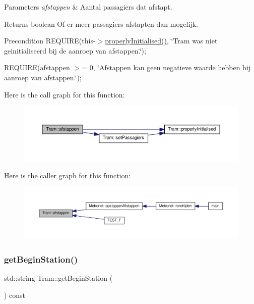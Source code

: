 \begin{DoxyParams}{Parameters}
{\em afstappen} & Aantal passagiers dat afstapt. \\
\hline
\end{DoxyParams}
\begin{DoxyReturn}{Returns}
boolean Of er meer passagiers afstapten dan mogelijk. 
\end{DoxyReturn}
\begin{DoxyPrecond}{Precondition}
R\+E\+Q\+U\+I\+RE(this-\/$>$\hyperlink{class_tram_ac2688f590e4db232b4f535c9bf959efb}{properly\+Initialised()}, \char`\"{}\+Tram was niet geinitialiseerd bij de aanroep van afstappen.\char`\"{}); 

R\+E\+Q\+U\+I\+RE(afstappen $>$= 0, \char`\"{}\+Afstappen kan geen negatieve waarde hebben bij aanroep van afstappen.\char`\"{}); 
\end{DoxyPrecond}
Here is the call graph for this function\+:\nopagebreak
\begin{figure}[H]
\begin{center}
\leavevmode
\includegraphics[width=350pt]{class_tram_a81186910caa5212b4a87eec84cd10a46_cgraph}
\end{center}
\end{figure}
Here is the caller graph for this function\+:\nopagebreak
\begin{figure}[H]
\begin{center}
\leavevmode
\includegraphics[width=350pt]{class_tram_a81186910caa5212b4a87eec84cd10a46_icgraph}
\end{center}
\end{figure}
\mbox{\label{class_tram_ae4a7cf6313452140ed54d219d1f6afba}} 
\subsubsection{\texorpdfstring{get\+Begin\+Station()}{getBeginStation()}}
{\footnotesize\ttfamily std\+::string Tram\+::get\+Begin\+Station (\begin{DoxyParamCaption}{ }\end{DoxyParamCaption}) const}



